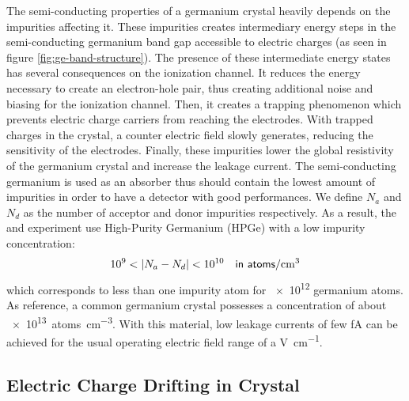 The semi-conducting properties of a germanium crystal heavily depends on the impurities affecting it.
These impurities creates intermediary energy steps in the semi-conducting germanium band gap accessible to electric charges (as seen in figure \ref{fig:ge-band-structure}). The presence of these intermediate energy states  has several consequences on the ionization channel. It reduces the energy necessary to create an electron-hole pair, thus creating additional noise and biasing for the ionization channel. Then, it creates a trapping phenomenon which prevents electric charge carriers from reaching the electrodes. With trapped charges in the crystal, a counter electric field slowly generates, reducing the sensitivity of the electrodes. Finally, these impurities lower the global resistivity of the germanium crystal and increase the leakage current.
The semi-conducting germanium is used as an absorber thus should contain the lowest amount of impurities in order to have a detector with good performances.
We define $N_a$ and $N_d$ as the number of acceptor and donor impurities respectively.
As a result, the \Edelweiss{} and \Ricochet{} experiment use High-Purity Germanium (HPGe) with a low impurity concentration:
\begin{equation}
10^{9} < |N_a - N_d| < 10^{10} \quad \textsf{in \si{\textsf{atoms}\per\cm^{3}}}
\end{equation}
which corresponds to less than one impurity atom for \num{e12} germanium atoms. As reference, a common germanium crystal possesses a concentration of about \SI{e13}{\textsf{atoms}\per\cm^{3}}.  With this material, low leakage currents of few \si{\femto\ampere} can be achieved for the usual operating electric field range of a \si{\volt\per\cm}.


\subsection{Electric Charge Drifting in Crystal}
\label{par:charge-drifting}
\label{par:charge-drift}
\label{par:trapping}


